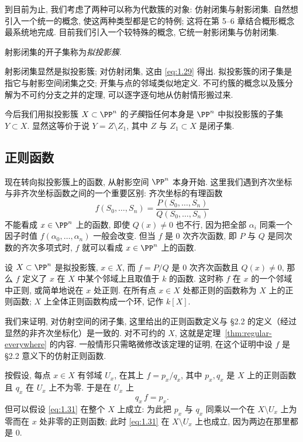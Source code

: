 到目前为止, 我们考虑了两种可以称为代数簇的对象: 仿射闭集与射影闭集. 自然想引入一个统一的概念, 使这两种类型都是它的特例; 这将在第 5--6 章结合概形概念最系统地完成. 目前我们引入一个较特殊的概念, 它统一射影闭集与仿射闭集.

\begin{definition}[拟投影簇]\label{def:quasiprojective}
	射影闭集的开子集称为\emph{拟投影簇}.
\end{definition}

射影闭集显然是拟投影簇; 对仿射闭集, 这由 \eqref{eq:1.29} 得出. 拟投影簇的闭子集是指它与射影空间闭集之交; 开集与点的邻域类似地定义. 不可约簇的概念以及簇分解为不可约分支之并的定理, 可以逐字逐句地从仿射情形搬过来.

今后我们用拟投影簇 $X \subset \PP^n$ 的\emph{子簇}指任何本身是 $\PP^n$ 中拟投影簇的子集 $Y \subset X$. 显然这等价于说 $Y = Z \setminus Z_1$, 其中 $Z$ 与 $Z_1 \subset X$ 是闭子集.

\subsection{正则函数}

现在转向拟投影簇上的函数, 从射影空间 $\PP^n$ 本身开始. 这里我们遇到齐次坐标与非齐次坐标函数之间的一个重要区别: 齐次坐标的有理函数
\begin{equation}
	\label{eq:1.30}
	f(S_0, \ldots, S_n) = \frac{P(S_0, \ldots, S_n)}{Q(S_0, \ldots, S_n)}
\end{equation}
不能看成 $x \in \PP^n$ 上的函数, 即使 $Q(x) \ne 0$ 也不行, 因为把全部 $\alpha_i$ 同乘一个因子时值 $f(\alpha_0, \ldots, \alpha_n)$ 一般会改变. 但当 $f$ 是 $0$ 次齐次函数, 即 $P$ 与 $Q$ 是同次数的齐次多项式时, $f$ 就可以看成 $x \in \PP^n$ 上的函数.

设 $X \subset \PP^n$ 是拟投影簇, $x \in X$, 而 $f = P/Q$ 是 $0$ 次齐次函数且 $Q(x) \ne 0$, 那么 $f$ 定义了 $x$ 在 $X$ 中某个邻域上且取值于 $k$ 的函数. 这时称 $f$ 在 $x$ 的一个邻域中正则, 或简单地说在 $x$ 处正则. 在所有点 $x \in X$ 处都正则的函数称为 $X$ 上的正则函数; $X$ 上全体正则函数构成一个环, 记作 $k[X]$.

我们来证明, 对仿射空间的闭子集, 这里给出的正则函数定义与 §2.2 的定义（经过显然的非齐次坐标化）是一致的. 对不可约的 $X$, 这就是定理~\ref{thm:regular-everywhere} 的内容. 一般情形只需略微修改该定理的证明, 在这个证明中设 $f$ 是 §2.2 意义下的仿射正则函数.

按假设, 每点 $x \in X$ 有邻域 $U_x$, 在其上 $f = p_x / q_x$, 其中 $p_x, q_x$ 是 $X$ 上的正则函数且 $q_x$ 在 $U_x$ 上不为零. 于是在 $U_x$ 上
\begin{equation}
	\label{eq:1.31}
	q_x\, f = p_x.
\end{equation}
但可以假设 \eqref{eq:1.31} 在整个 $X$ 上成立: 为此把 $p_x$ 与 $q_x$ 同乘以一个在 $X \setminus U_x$ 上为零而在 $x$ 处非零的正则函数; 此时 \eqref{eq:1.31} 在 $X \setminus U_x$ 上也成立, 因为两边在那里都是 $0$.

